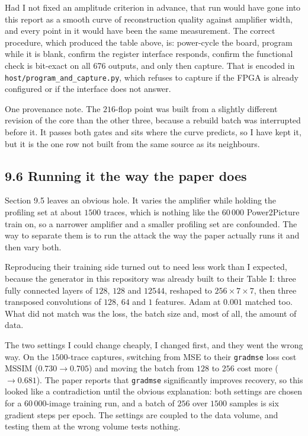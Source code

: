 \documentclass[11pt,a4paper]{article}
\begin{document}
Had I not fixed an amplitude criterion in advance, that run would have gone into this
report as a smooth curve of reconstruction quality against amplifier width, and every
point in it would have been the same measurement. The correct procedure, which produced
the table above, is: power-cycle the board, program while it is blank, confirm the
register interface responds, confirm the functional check is bit-exact on all 676 outputs,
and only then capture. That is encoded in \texttt{host/program\_and\_capture.py}, which
refuses to capture if the FPGA is already configured or if the interface does not answer.

One provenance note. The $216$-flop point was built from a slightly different revision of
the core than the other three, because a rebuild batch was interrupted before it. It
passes both gates and sits where the curve predicts, so I have kept it, but it is the one
row not built from the same source as its neighbours.


\subsection*{9.6 Running it the way the paper does}

Section 9.5 leaves an obvious hole. It varies the amplifier while holding the profiling
set at about $1500$ traces, which is nothing like the $60\,000$ Power2Picture train on,
so a narrower amplifier and a smaller profiling set are confounded. The way to separate
them is to run the attack the way the paper actually runs it and then vary both.

Reproducing their training side turned out to need less work than I expected, because the
generator in this repository was already built to their Table I: three fully connected
layers of $128$, $128$ and $12544$, reshaped to $256\times7\times7$, then three transposed
convolutions of $128$, $64$ and $1$ features. Adam at $0.001$ matched too. What did not
match was the loss, the batch size and, most of all, the amount of data.

\begin{table}[h]
  \centering
  \small
  \resizebox{\textwidth}{!}{}
  \caption{Where this setup now matches Power2Picture and where it cannot.}
  \label{tab:papersettings}
\end{table}

The two settings I could change cheaply, I changed first, and they went the wrong way. On
the $1500$-trace captures, switching from MSE to their \texttt{gradmse} loss cost MSSIM
($0.730 \to 0.705$) and moving the batch from $128$ to $256$ cost more ($\to 0.681$). The
paper reports that \texttt{gradmse} significantly improves recovery, so this looked like a
contradiction until the obvious explanation: both settings are chosen for a $60\,000$-image
training run, and a batch of $256$ over $1500$ samples is six gradient steps per epoch.
The settings are coupled to the data volume, and testing them at the wrong volume tests
nothing.
\end{document}
